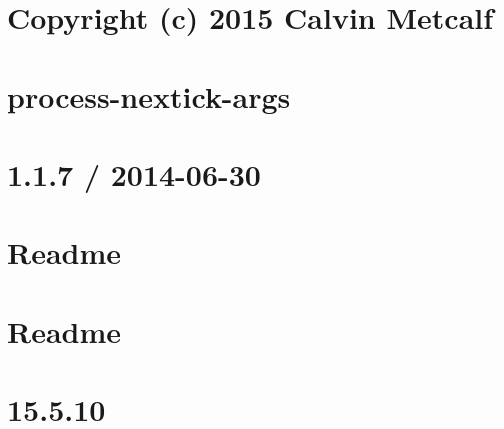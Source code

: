 \documentclass[twoside]{book}
\newcommand{\+}{\discretionary{\mbox{\scriptsize$\hookleftarrow$}}{}{}}
\begin{document}
\chapter{Copyright (c) 2015 Calvin Metcalf}
\label{md__c_1_workspace_demo_src_main_script_node_modules_process-nextick-args_license}

\chapter{process-\/nextick-\/args}
\label{md__c_1_workspace_demo_src_main_script_node_modules_process-nextick-args_readme}

\chapter{1.1.7 / 2014-\/06-\/30}
\label{md__c_1_workspace_demo_src_main_script_node_modules_progress__history}

\chapter{Readme}
\label{md__c_1_workspace_demo_src_main_script_node_modules_progress__readme}

\chapter{Readme}
\label{md__c_1_workspace_demo_src_main_script_node_modules_promise__readme}

\chapter{15.5.10}
\label{md__c_1_workspace_demo_src_main_script_node_modules_prop-types__c_h_a_n_g_e_l_o_g}

\end{document}
